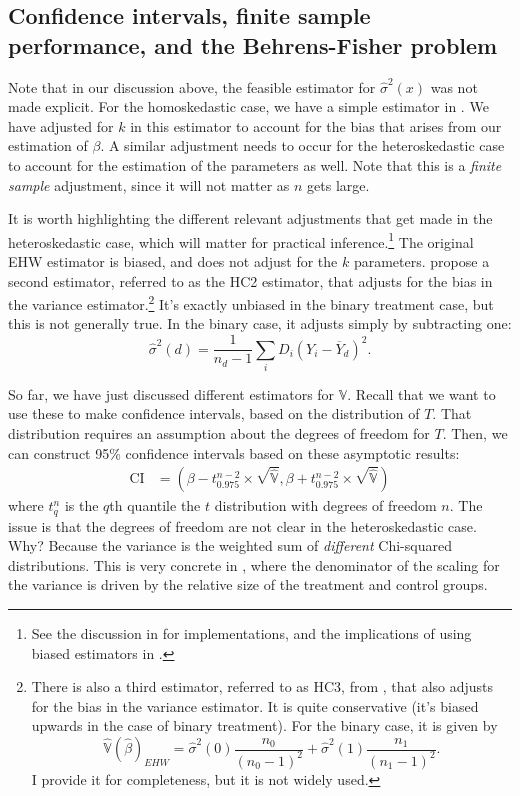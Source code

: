 \documentclass{tufte-handout}
\theoremstyle{break}
\begin{document}
\subsection{Confidence intervals, finite sample performance, and the Behrens-Fisher problem}
Note that in our discussion above, the feasible estimator for $\hat{\sigma}^{2}(x)$ was not made explicit. For the homoskedastic case, we have a simple estimator in . We have adjusted for $k$ in this estimator to account for the bias that arises from our estimation of $\beta$. A similar adjustment needs to occur for the heteroskedastic case to account for the estimation of the parameters as well. Note that this is a \emph{finite sample} adjustment, since it will not matter as $n$ gets large.

It is worth highlighting the different relevant adjustments that get made in the heteroskedastic case, which will matter for practical inference.\footnote{See the discussion in  for implementations, and the implications of using biased estimators in .} The original EHW estimator is biased, and does not adjust for the $k$ parameters. \citet{mackinnon1985some} propose a second estimator, referred to as the HC2 estimator, that adjusts for the bias in the variance estimator.\footnote{There is also a third estimator, referred to as HC3, from \citet{mackinnon2012thirty}, that also adjusts for the bias in the variance estimator. It is quite conservative (it's biased upwards in the case of binary treatment). For the binary case, it is given by
\begin{equation*}
  \hat{\mathbb{V}}(\hat{\beta})_{EHW} = \hat{\sigma}^{2}(0)\frac{n_{0}}{(n_{0}-1)^{2}} + \hat{\sigma}^{2}(1)\frac{n_{1}}{(n_{1}-1)^{2}}.
\end{equation*}
I provide it for completeness, but it is not widely used.}
It's exactly unbiased in the binary treatment case, but this is not generally true. In the binary case, it adjusts simply by subtracting one:
\begin{equation*}
  \hat{\sigma}^{2}(d) = \frac{1}{n_{d} -1}\sum_{i}D_{i} (Y_{i} - \overline{Y}_{d})^{2}.
\end{equation*}

So far, we have just discussed different estimators for $\mathbb{V}$. Recall that we want to use these to make confidence intervals, based on the distribution of $T$. That distribution requires an assumption about the degrees of freedom for $T$. Then, we can construct 95\% confidence intervals based on these asymptotic results:
\begin{align*}
\text{CI} &= \left(\beta - t^{n-2}_{0.975}\times \sqrt{\hat{\mathbb{V}}}, \beta + t^{n-2}_{0.975}\times \sqrt{\hat{\mathbb{V}}}\right)
\end{align*}
where $t^{n}_{q}$ is the $q$th quantile the $t$ distribution with degrees of freedom $n$. The issue is that the degrees of freedom are not clear in the heteroskedastic case. Why? Because the variance is the weighted sum of \emph{different} Chi-squared distributions. This is very concrete in , where the denominator of the scaling for the variance is driven by the relative size of the treatment and control groups.
\end{document}
